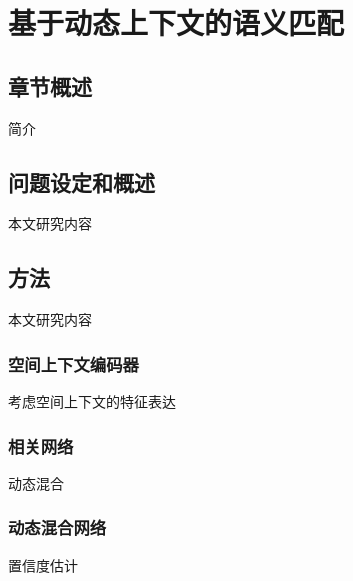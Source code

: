 \chapter{基于动态上下文的语义匹配}

\section{章节概述}
简介
\section{问题设定和概述}
本文研究内容
\section{方法}
本文研究内容
\subsection{空间上下文编码器}
考虑空间上下文的特征表达
\subsection{相关网络}
动态混合
\subsection{动态混合网络}
置信度估计

